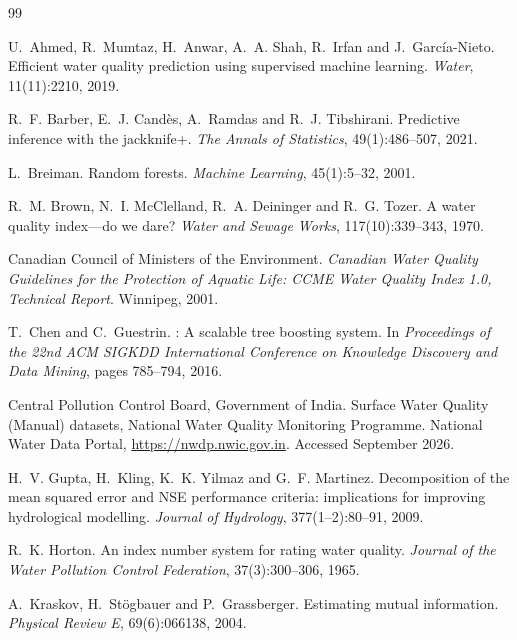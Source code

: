 \begin{thebibliography}{99}
\small

U.~Ahmed, R.~Mumtaz, H.~Anwar, A.~A. Shah, R.~Irfan and J.~Garc\'ia-Nieto.
\newblock Efficient water quality prediction using supervised machine learning.
\newblock \emph{Water}, 11(11):2210, 2019.

R.~F. Barber, E.~J. Cand\`es, A.~Ramdas and R.~J. Tibshirani.
\newblock Predictive inference with the jackknife+.
\newblock \emph{The Annals of Statistics}, 49(1):486--507, 2021.

L.~Breiman.
\newblock Random forests.
\newblock \emph{Machine Learning}, 45(1):5--32, 2001.

R.~M. Brown, N.~I. McClelland, R.~A. Deininger and R.~G. Tozer.
\newblock A water quality index---do we dare?
\newblock \emph{Water and Sewage Works}, 117(10):339--343, 1970.

Canadian Council of Ministers of the Environment.
\newblock \emph{Canadian Water Quality Guidelines for the Protection of Aquatic Life: CCME Water Quality Index 1.0, Technical Report}.
\newblock Winnipeg, 2001.

T.~Chen and C.~Guestrin.
: A scalable tree boosting system.
\newblock In \emph{Proceedings of the 22nd ACM SIGKDD International Conference on Knowledge Discovery and Data Mining}, pages 785--794, 2016.

Central Pollution Control Board, Government of India.
\newblock Surface Water Quality (Manual) datasets, National Water Quality Monitoring Programme.
\newblock National Water Data Portal, \url{https://nwdp.nwic.gov.in}. Accessed September 2026.

H.~V. Gupta, H.~Kling, K.~K. Yilmaz and G.~F. Martinez.
\newblock Decomposition of the mean squared error and {NSE} performance criteria: implications for improving hydrological modelling.
\newblock \emph{Journal of Hydrology}, 377(1--2):80--91, 2009.

R.~K. Horton.
\newblock An index number system for rating water quality.
\newblock \emph{Journal of the Water Pollution Control Federation}, 37(3):300--306, 1965.

A.~Kraskov, H.~St\"ogbauer and P.~Grassberger.
\newblock Estimating mutual information.
\newblock \emph{Physical Review E}, 69(6):066138, 2004.


\end{thebibliography}
